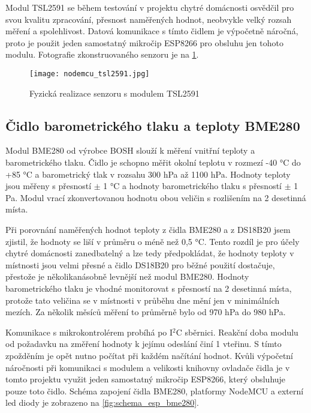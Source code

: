 Modul TSL2591 se během testování v projektu chytré domácnosti osvědčil pro svou kvalitu zpracování, přesnost naměřených hodnot, neobvykle velký rozsah měření a spolehlivost. Datová komunikace s tímto čidlem je výpočetně náročná, proto je použit jeden samostatný mikročip ESP8266 pro obsluhu jen tohoto modulu. Fotografie zkonstruovaného senzoru je na \cref{fig:nodemcu_tsl2591}.

\begin{figure}[H]
  \centering
  \texttt{[image: nodemcu\_tsl2591.jpg]}
  \caption{Fyzická realizace senzoru s modulem TSL2591}
  \label{fig:nodemcu_tsl2591}
\end{figure} 

\subsection{Čidlo barometrického tlaku a teploty BME280}

Modul BME280 \cite{BME280:Datasheet} od výrobce BOSH slouží k měření vnitřní teploty a barometrického tlaku. Čidlo je schopno měřit okolní teplotu v rozmezí -40 \si{\degree}C do +85 \si{\degree}C a barometrický tlak v rozsahu 300 \si{hPa} až 1100 \si{hPa}. Hodnoty teploty jsou měřeny s přesností $\pm$ 1 \si{\degree}C a hodnoty barometrického tlaku s přesností $\pm$ 1 \si{Pa}. Modul vrací zkonvertovanou hodnotu obou veličin s rozlišením na 2 desetinná místa. \par
Při porovnání naměřených hodnot teploty z čidla BME280 a z DS18B20 jsem zjistil, že hodnoty se liší v průměru o méně než 0,5 \si{\degree}C. Tento rozdíl je pro účely chytré domácnosti zanedbatelný a lze tedy předpokládat, že hodnoty teploty v místnosti jsou velmi přesné a čidlo DS18B20 pro běžné použití dostačuje, přestože je několikanásobně levnější než modul BME280. Hodnoty barometrického tlaku je vhodné monitorovat s přesností na 2 desetinná místa, protože tato veličina se v místnosti v průběhu dne mění jen v minimálních mezích. Za několik měsíců měření to průměrně bylo od 970 \si{hPa} do 980 \si{hPa}.\par
Komunikace s mikrokontrolérem probíhá po I$^2$C sběrnici. Reakční doba modulu od požadavku na změření hodnoty k jejímu odeslání činí 1 vteřinu. S tímto zpožděním je opět nutno počítat při každém načítání hodnot. Kvůli výpočetní náročnosti při komunikaci s modulem a velikosti knihovny ovladače čidla je v tomto projektu využit jeden samostatný mikročip ESP8266, který obsluhuje pouze toto čidlo. Schéma zapojení čidla BME280, platformy NodeMCU a externí led diody je zobrazeno na \cref{fig:schema_esp_bme280}.

